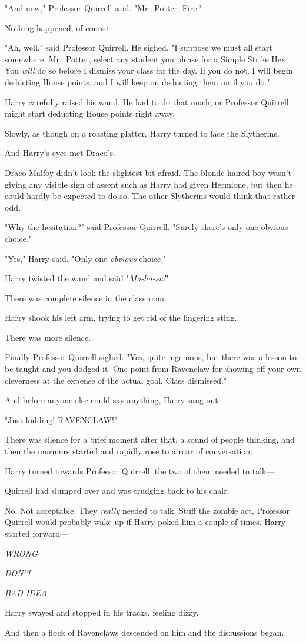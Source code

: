 "And now," Professor Quirrell said. "Mr.~Potter. Fire."

Nothing happened, of course.

"Ah, well," said Professor Quirrell. He sighed. "I suppose we must all start
somewhere. Mr.~Potter, select any student you please for a Simple Strike Hex.
You \emph{will} do so before I dismiss your class for the day. If you do not, I
will begin deducting House points, and I will keep on deducting them until you
do."

Harry carefully raised his wand. He had to do that much, or Professor Quirrell
might start deducting House points right away.

Slowly, as though on a roasting platter, Harry turned to face the Slytherins.

And Harry's eyes met Draco's.

Draco Malfoy didn't look the slightest bit afraid. The blonde-haired boy wasn't
giving any visible sign of assent such as Harry had given Hermione, but then he
could hardly be expected to do so. The other Slytherins would think that rather
odd.

"Why the hesitation?" said Professor Quirrell. "Surely there's only one obvious
choice."

"Yes," Harry said. "Only one \emph{obvious} choice."

Harry twisted the wand and said "\emph{Ma-ha-su!}"

There was complete silence in the classroom.

Harry shook his left arm, trying to get rid of the lingering sting.

There was more silence.

Finally Professor Quirrell sighed. "Yes, quite ingenious, but there was a
lesson to be taught and you dodged it. One point from Ravenclaw for showing off
your own cleverness at the expense of the actual goal. Class dismissed."

And before anyone else could say anything, Harry sang out:

"Just kidding! RAVENCLAW!"

There was silence for a brief moment after that, a sound of people thinking,
and then the murmurs started and rapidly rose to a roar of conversation.

Harry turned towards Professor Quirrell, the two of them needed to talk---

Quirrell had slumped over and was trudging back to his chair.

No. Not acceptable. They \emph{really} needed to talk. Stuff the zombie act,
Professor Quirrell would probably wake up if Harry poked him a couple of times.
Harry started forward---

\emph{WRONG}

\emph{DON'T}

\emph{BAD IDEA}

Harry swayed and stopped in his tracks, feeling dizzy.

And then a flock of Ravenclaws descended on him and the discussions began.
